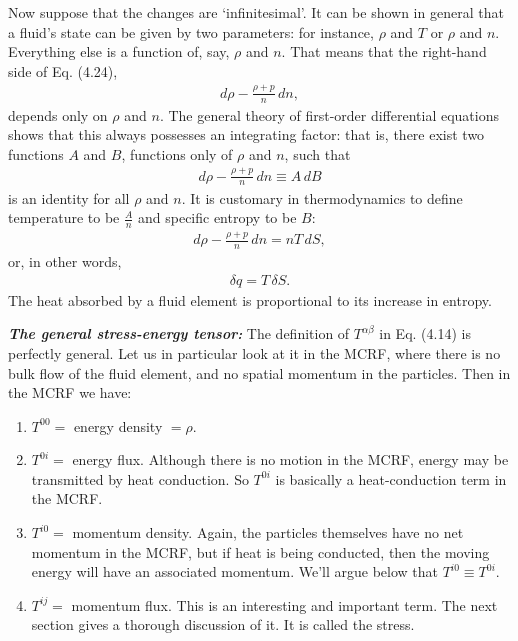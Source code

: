 \documentclass[12pt]{book}
\begin{document}
    Now suppose that the changes are ‘infinitesimal’. It can be shown in general that a fluid’s state can be given by two parameters: for instance, \(\rho\) and \(T\) or \(\rho\) and \(n\). Everything else is a function of, say, \(\rho\) and \(n\). That means that the right-hand side of Eq. (4.24),
    \begin{align}
    d\rho - \frac{\rho + p}{n} \, dn,
    \end{align}
    depends only on \(\rho\) and \(n\). The general theory of first-order differential equations shows that this always possesses an integrating factor: that is, there exist two functions \(A\) and \(B\), functions only of \(\rho\) and \(n\), such that
    \begin{align}
    d\rho - \frac{\rho + p}{n} \, dn \equiv A \, dB
    \end{align}
    is an identity for all \(\rho\) and \(n\). It is customary in thermodynamics to define temperature to be \( \frac{A}{n} \) and specific entropy to be \( B \):
    \begin{align}
    d\rho - \frac{\rho + p}{n} \, dn = nT \, dS, \tag{4.25}
    \end{align}
    or, in other words,
    \begin{align}
    \delta q = T \, \delta S. \tag{4.26}
    \end{align}
    The heat absorbed by a fluid element is proportional to its increase in entropy.

    \textbf{\textit{The general stress-energy tensor:}}
    The definition of \(T^{\alpha\beta}\) in Eq. (4.14) is perfectly general. Let us in particular look at it in the MCRF, where there is no bulk flow of the fluid element, and no spatial momentum in the particles. Then in the MCRF we have:

    \begin{enumerate}
        \item \(T^{00} = \) energy density \(= \rho\).
        \item \(T^{0i} = \) energy flux. Although there is no motion in the MCRF, energy may be transmitted by heat conduction. So \(T^{0i}\) is basically a heat-conduction term in the MCRF.
        \item \(T^{i0} = \) momentum density. Again, the particles themselves have no net momentum in the MCRF, but if heat is being conducted, then the moving energy will have an associated momentum. We’ll argue below that \(T^{i0} \equiv T^{0i}\).
        \item \(T^{ij} = \) momentum flux. This is an interesting and important term. The next section gives a thorough discussion of it. It is called the stress.
    \end{enumerate}
\end{document}
